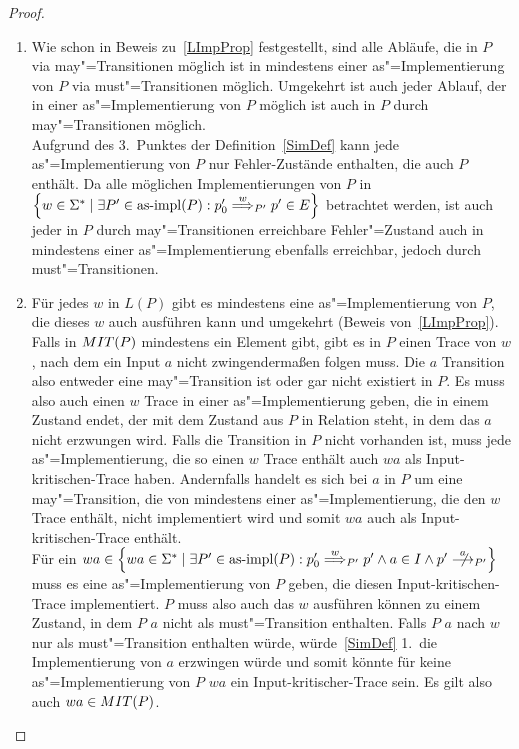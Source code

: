 \begin{proof}\mbox{}
  \begin{enumerate}
    \item Wie schon in Beweis zu~\ref{LImpProp} festgestellt, sind alle
      Abläufe, die in $P$ via may"=Transitionen möglich ist in mindestens einer
      as"=Implementierung von $P$ via must"=Transitionen möglich. Umgekehrt ist
      auch jeder Ablauf, der in einer as"=Implementierung von $P$ möglich ist
      auch in $P$ durch may"=Transitionen möglich.\\
      Aufgrund des 3.\ Punktes der Definition~\ref{SimDef} kann jede
      as"=Implementierung von $P$ nur Fehler-Zustände enthalten,
      die auch $P$ enthält. Da alle möglichen Implementierungen von $P$ in
      $\left\{w\in\Sigma ^* \mid \exists P' \in\asimp (P) : p'_0
      \weakmust[w]_{P'} p' \in E\right\}$ betrachtet werden, ist auch jeder in
      $P$ durch may"=Transitionen erreichbare Fehler"=Zustand auch in
      mindestens einer as"=Implementierung ebenfalls erreichbar, jedoch durch
      must"=Transitionen.
    \item Für jedes $w$ in $L(P)$ gibt es mindestens eine as"=Implementierung
      von $P$, die dieses $w$ auch ausführen kann und umgekehrt (Beweis
      von~\ref{LImpProp}). Falls in $MIT (P)$ mindestens ein Element gibt,
      gibt es in $P$ einen Trace von $w$, nach dem ein Input $a$ nicht
      zwingendermaßen folgen muss. Die $a$ Transition also entweder eine
      may"=Transition ist oder gar nicht existiert in $P$. Es muss also auch
      einen $w$ Trace in einer as"=Implementierung geben, die in einem Zustand
      endet, der mit dem Zustand aus $P$ in Relation steht, in dem das $a$
      nicht erzwungen wird. Falls die Transition in $P$ nicht vorhanden ist,
      muss jede as"=Implementierung, die so einen $w$ Trace enthält auch $wa$
      als Input-kritischen-Trace haben. Andernfalls handelt es sich bei $a$ in
      $P$ um eine may"=Transition, die von mindestens einer
      as"=Implementierung, die den $w$ Trace enthält, nicht implementiert wird
      und somit $wa$ auch als Input-kritischen-Trace enthält.\\
      Für ein $wa\in \left\{wa\in\Sigma ^* \mid \exists P' \in\asimp (P) : p'_0
      \weakmust[w]_{P'} p' \land a\in I\land p'\nmust[a]_{P'} \right\}$ muss es
      eine as"=Implementierung von $P$ geben, die diesen Input-kritischen-Trace
      implementiert. $P$ muss also auch das $w$ ausführen können zu einem
      Zustand, in dem $P$ $a$ nicht als must"=Transition enthalten. Falls $P$
      $a$ nach $w$ nur als must"=Transition enthalten würde, würde~\ref{SimDef}
      1.\ die Implementierung von $a$ erzwingen würde und somit könnte für
      keine as"=Implementierung von $P$ $wa$ ein Input-kritischer-Trace sein.
      Es gilt also auch $wa\in MIT (P)$.
  \end{enumerate}
\end{proof}

